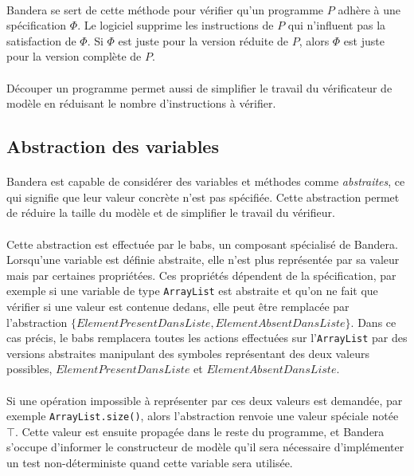 \paragraph{}
Bandera se sert de cette méthode pour vérifier qu'un programme $P$
adhère à une spécification $\Phi$. Le logiciel supprime les
instructions de $P$ qui n'influent pas la satisfaction de $\Phi$. Si
$\Phi$ est juste pour la version réduite de $P$, alors $\Phi$ est
juste pour la version complète de $P$.

\paragraph{}
Découper un programme permet aussi de simplifier le travail du
vérificateur de modèle en réduisant le nombre d'instructions à
vérifier.

\subsection{Abstraction des variables}
\label{sec:bandera_abstraction}

\paragraph{}
Bandera est capable de considérer des variables et méthodes comme
\textit{abstraites}, ce qui signifie que leur valeur concrète n'est
pas spécifiée. Cette abstraction permet de réduire la taille du modèle
et de simplifier le travail du vérifieur.

\paragraph{}
Cette abstraction est effectuée par le \gls{babs}, un composant
spécialisé de Bandera. Lorsqu'une variable est définie abstraite, elle
n'est plus représentée par sa valeur mais par certaines
propriétées. Ces propriétés dépendent de la spécification, par exemple
si une variable de type \verb|ArrayList| est abstraite et qu'on ne
fait que vérifier si une valeur est contenue dedans, elle peut être
remplacée par l'abstraction
$\{ ElementPresentDansListe, ElementAbsentDansListe \}$. Dans ce cas
précis, le \gls{babs} remplacera toutes les actions effectuées sur
l'\verb|ArrayList| par des versions abstraites manipulant des symboles
représentant des deux valeurs possibles, $ElementPresentDansListe$ et
$ElementAbsentDansListe$.

\paragraph{}
Si une opération impossible à représenter par ces deux valeurs est
demandée, par exemple \verb|ArrayList.size()|, alors l'abstraction
renvoie une valeur spéciale notée $\top$. Cette valeur est ensuite
propagée dans le reste du programme, et Bandera s'occupe d'informer le
constructeur de modèle qu'il sera nécessaire d'implémenter un test
non-déterministe quand cette variable sera utilisée.

